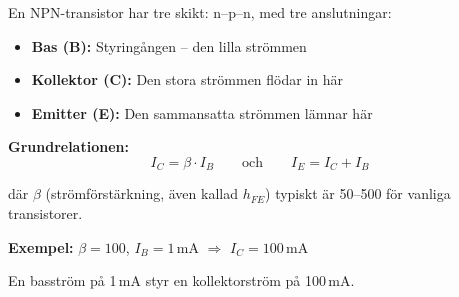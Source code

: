 \documentclass[a4paper,11pt,twoside]{book}
\newcommand{\emoji}[1]{{\emojifont #1}}
\begin{document}
\begin{bluebox}[title={\emoji{🔑} Bipolär transistor (BJT) -- grundbegrepp}]
En NPN-transistor har tre skikt: n--p--n, med tre anslutningar:

\begin{itemize}
  \item \textbf{Bas (B):} Styringången -- den lilla strömmen
  \item \textbf{Kollektor (C):} Den stora strömmen flödar in här
  \item \textbf{Emitter (E):} Den sammansatta strömmen lämnar här
\end{itemize}

\medskip
\textbf{Grundrelationen:}
\[ I_C = \beta \cdot I_B \qquad \text{och} \qquad I_E = I_C + I_B \]

där $\beta$ (strömförstärkning, även kallad $h_{FE}$) typiskt
är 50--500 för vanliga transistorer.

\medskip
\textbf{Exempel:} $\beta = 100$, $I_B = 1\,\text{mA}$
$\Rightarrow$ $I_C = 100\,\text{mA}$

En basström på 1\,mA styr en kollektorström på 100\,mA.
\end{bluebox}
\end{document}
